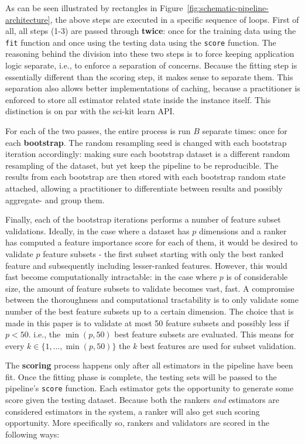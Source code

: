 \documentclass[../main.tex]{subfiles}
\begin{document}
As can be seen illustrated by rectangles in Figure~\ref{fig:schematic-pipeline-architecture}, the above steps are executed in a specific sequence of loops. First of all, all steps (1-3) are passed through \textbf{twice}: once for the training data using the \texttt{fit} function and once using the testing data using the \texttt{score} function. The reasoning behind the division into these two steps is to force keeping application logic separate, i.e., to enforce a separation of concerns. Because the fitting step is essentially different than the scoring step, it makes sense to separate them. This separation also allows better implementations of caching, because a practitioner is enforced to store all estimator related state inside the instance itself. This distinction is on par with the sci-kit learn \citep{pedregosa_scikit-learn_2011} API.

For each of the two passes, the entire process is run $B$ separate times: once for each \textbf{bootstrap}. The random resampling seed is changed with each bootstrap iteration accordingly: making sure each bootstrap dataset is a different random resampling of the dataset, but yet keep the pipeline to be reproducible. The results from each bootstrap are then stored with each bootstrap random state attached, allowing a practitioner to differentiate between results and possibly aggregate- and group them.

Finally, each of the bootstrap iterations performs a number of feature subset validations. Ideally, in the case where a dataset has $p$ dimensions and a ranker has computed a feature importance score for each of them, it would be desired to validate $p$ feature subsets - the first subset starting with only the best ranked feature and subsequently including lesser-ranked features. However, this would fast become computationally intractable: in the case where $p$ is of considerable size, the amount of feature subsets to validate becomes vast, fast. A compromise between the thoroughness and computational tractability is to only validate some number of the best feature subsets up to a certain dimension. The choice that is made in this paper is to validate at most 50 feature subsets and possibly less if $p < 50$. i.e., the $\min (p, 50)$ best feature subsets are evaluated. This means for every $k \in \{1,\ldots,\min (p, 50) \}$ the $k$ best features are used for subset validation.

The \textbf{scoring} process happens only after all estimators in the pipeline have been fit. Once the fitting phase is complete, the testing sets will be passed to the pipeline's \texttt{score} function. Each estimator gets the opportunity to generate some score given the testing dataset. Because both the rankers \textit{and} estimators are considered estimators in the system, a ranker will also get such scoring opportunity. More specifically so, rankers and validators are scored in the following ways:
\end{document}
